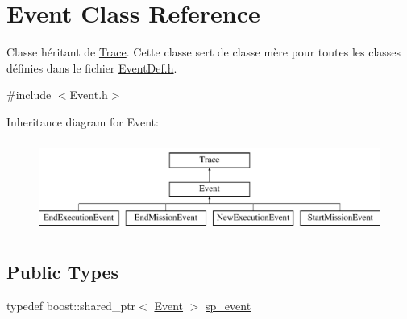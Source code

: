 \hypertarget{class_event}{}\section{Event Class Reference}
\label{class_event}


Classe héritant de \hyperlink{class_trace}{Trace}. Cette classe sert de classe mère pour toutes les classes définies dans le fichier \hyperlink{_event_def_8h}{Event\+Def.\+h}.  




{\ttfamily \#include $<$Event.\+h$>$}

Inheritance diagram for Event\+:\begin{figure}[H]
\begin{center}
\leavevmode
\includegraphics[height=3.000000cm]{class_event}
\end{center}
\end{figure}
\subsection*{Public Types}
\begin{DoxyCompactItemize}
\item 
typedef boost\+::shared\+\_\+ptr$<$ \hyperlink{class_event}{Event} $>$ \hyperlink{class_event_af09ed5d4baca5790d6decf72075dfe13}{sp\+\_\+event}
\end{DoxyCompactItemize}
